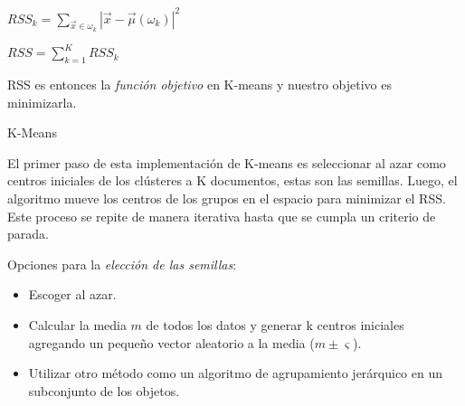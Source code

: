 \documentclass{llncs}
\DeclareMathOperator*{\argmin}{arg\,min}
\begin{document}
	\begin{center}
		$ RSS_{k} = \sum_{\overrightarrow{x} \in \omega_{k}}|\overrightarrow{x} - \overrightarrow{\mu}(\omega_{k})|^2$
	
	\vspace{1em}
	$ RSS = \sum_{k=1}^{K} RSS_{k} $
	\end{center}

	RSS es entonces la \textit{función objetivo} en K-means y nuestro objetivo es minimizarla.
	
	\begin{algorithm}
		\caption{K-Means}
		\begin{algorithmic}[1]
			\EndFor
				\EndFor
				\State{$ j \leftarrow \argmin_{j'}|\overrightarrow{\mu_{j'}}-\overrightarrow{x_{n}}| $}
				\EndFor
				\EndFor
			\EndWhile
		\end{algorithmic}
	\end{algorithm}

El primer paso de esta implementaci\'on de K-means es seleccionar al azar como centros iniciales de los cl\'usteres a K documentos, estas son las semillas. Luego, el algoritmo mueve los centros de los grupos en el espacio para minimizar el RSS. Este proceso se repite de manera iterativa hasta que se cumpla un criterio de parada.

Opciones para la \textit{elecci\'on de las semillas}:
\begin{itemize}
	\item Escoger al azar.
	\item Calcular la media $ m $ de todos los datos y generar k centros iniciales agregando un pequeño vector aleatorio a la media ($ m \pm \varsigma $).
	\item Utilizar otro método como un algoritmo de agrupamiento jerárquico en un subconjunto de los objetos.
\end{itemize}
\end{document}

